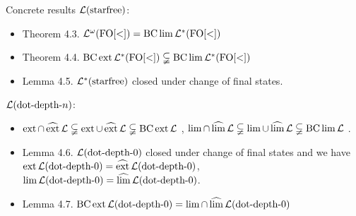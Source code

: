 \documentclass[
	handout,
	notheorems,noamsthm]{beamer}
\begin{document}
\begin{frame}[<+->]{Concrete results}
$\mathcal{L}(\textup{\textrm{starfree}})$:
\begin{itemize}
\item Theorem 4.3. $\mathcal{L}^\omega (\mathrm{FO[<]}) = \operatorname{BC} \lim \mathcal{L}^*(\mathrm{FO[<]})$
\item Theorem 4.4. $\operatorname{BC} \operatorname{ext} \mathcal{L}^*( \mathrm{FO[<]} ) \subsetneqq \operatorname{BC} \lim \mathcal{L}^* ( \mathrm{FO[<]} )$
\item Lemma 4.5. $\mathcal{L}^*(\textup{\textrm{starfree}})$ closed under change of final states.
\end{itemize}
$\mathcal{L}(\textup{\textrm{dot-depth-$n$}})$:
\begin{itemize}
\item $\operatorname{ext} \cap \operatorname{\widehat{ext}} \mathcal{L} \subsetneqq
\operatorname{ext} \cup \operatorname{\widehat{ext}} \mathcal{L} \subsetneqq
\operatorname{BC} \operatorname{ext} \mathcal{L}$ ,
$ \lim \cap \operatorname{\widehat{lim}} \mathcal{L} \subsetneqq
\lim \cup \operatorname{\widehat{lim}} \mathcal{L} \subsetneqq
\operatorname{BC} \lim \mathcal{L} $ .
\item Lemma 4.6. $\mathcal{L}(\textup{\textrm{dot-depth-$0$}})$ closed under change of final states and we have
$ \operatorname{ext} \mathcal{L}(\textup{\textrm{dot-depth-$0$}}) = \operatorname{\widehat{ext}} \mathcal{L}(\textup{\textrm{dot-depth-$0$}}) $,
$ \lim \mathcal{L}(\textup{\textrm{dot-depth-$0$}}) = \operatorname{\widehat{lim}} \mathcal{L}(\textup{\textrm{dot-depth-$0$}}) $. 
\item Lemma 4.7. $ \operatorname{BC} \operatorname{ext} \mathcal{L}(\textup{\textrm{dot-depth-$0$}}) = \lim \cap \operatorname{\widehat{lim}} \mathcal{L}(\textup{\textrm{dot-depth-$0$}}) $
\end{itemize}
\end{frame}
\end{document}

